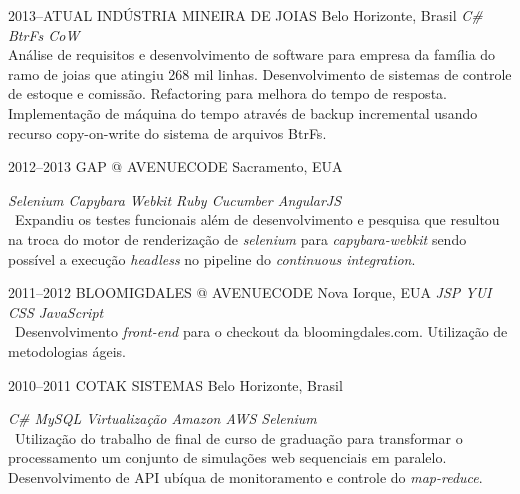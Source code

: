 \documentclass[]{friggeri-cv}
\begin{document}
\begin{entrylist}


\entry
{2013--ATUAL}
{INDÚSTRIA MINEIRA DE JOIAS}
{Belo Horizonte, Brasil}
{\emph{\bullet C\# \bullet BtrFs CoW  } \\ Análise de requisitos e desenvolvimento de software para empresa da família do ramo de joias que atingiu 268 mil linhas. Desenvolvimento de sistemas de controle de estoque e comissão. Refactoring para melhora do tempo de resposta. Implementação de máquina do tempo através de backup incremental usando recurso copy-on-write do sistema de arquivos BtrFs. }


\entry
{2012--2013}
{GAP @ AVENUECODE}
{Sacramento, EUA}
{\emph{\bullet Selenium \bullet Capybara \bullet Webkit \bullet Ruby \bullet Cucumber \bullet AngularJS } \\
\
Expandiu os testes funcionais além de desenvolvimento e pesquisa que resultou na troca do motor de renderização de \textit{selenium} para \textit{capybara-webkit} sendo possível a execução \textit{headless} no pipeline do \textit{continuous integration}.%

}


\entry
{2011--2012}
{BLOOMIGDALES @ AVENUECODE}
{Nova Iorque, EUA}
{\emph{\bullet JSP \bullet YUI \bullet CSS \bullet JavaScript } \\
\
Desenvolvimento \textit{front-end} para o checkout da bloomingdales.com. Utilização de metodologias ágeis.
}

\entry
{2010--2011}
{COTAK SISTEMAS}
{Belo Horizonte, Brasil}
{\emph{\bullet C\# \bullet MySQL \bullet Virtualização \bullet Amazon AWS \bullet Selenium } \\
\
Utilização do trabalho de final de curso de graduação para transformar o processamento um conjunto de simulações web sequenciais em paralelo. Desenvolvimento de API ubíqua de monitoramento e controle do \textit{map-reduce}.

}




\end{entrylist}
\end{document}
